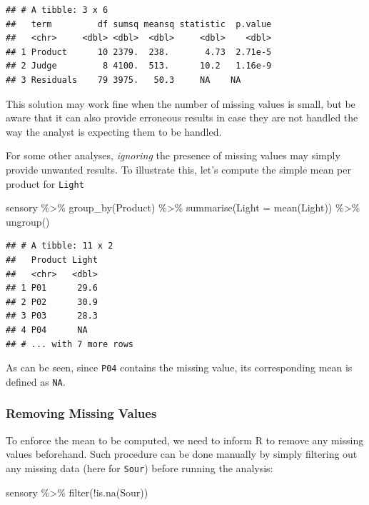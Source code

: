 \documentclass[
]{krantz}
\makeatletter
\newenvironment{Shaded}{\begin{snugshade}}{\end{snugshade}}
\newcommand{\AttributeTok}[1]{\textcolor[rgb]{0.61,0.61,0.61}{#1}}
\newcommand{\FunctionTok}[1]{\textcolor[rgb]{0,0,0}{#1}}
\newcommand{\NormalTok}[1]{#1}
\newcommand{\SpecialCharTok}[1]{\textcolor[rgb]{0,0,0}{#1}}
\newenvironment{kframe}{%
\medskip{}
\setlength{\fboxsep}{.8em}
 \def\at@end@of@kframe{}%
 \ifinner\ifhmode%
  \def\at@end@of@kframe{\end{minipage}}%
  \begin{minipage}{\columnwidth}%
 \fi\fi%
 \def\FrameCommand##1{\hskip\@totalleftmargin \hskip-\fboxsep
 \colorbox{shadecolor}{##1}\hskip-\fboxsep
     \hskip-\linewidth \hskip-\@totalleftmargin \hskip\columnwidth}%
 \MakeFramed {\advance\hsize-\width
   \@totalleftmargin\z@ \linewidth\hsize
   \@setminipage}}%
 {\par\unskip\endMakeFramed%
 \at@end@of@kframe}
\renewenvironment{Shaded}{\begin{kframe}}{\end{kframe}}
\makeatother
\begin{document}
\begin{verbatim}
## # A tibble: 3 x 6
##   term         df sumsq meansq statistic  p.value
##   <chr>     <dbl> <dbl>  <dbl>     <dbl>    <dbl>
## 1 Product      10 2379.  238.       4.73  2.71e-5
## 2 Judge         8 4100.  513.      10.2   1.16e-9
## 3 Residuals    79 3975.   50.3     NA    NA
\end{verbatim}

This solution may work fine when the number of missing values is small, but be aware that it can also provide erroneous results in case they are not handled the way the analyst is expecting them to be handled.

For some other analyses, \emph{ignoring} the presence of missing values may simply provide unwanted results. To illustrate this, let's compute the simple mean per product for \texttt{Light}

\begin{Shaded}
\begin{Highlighting}[]
\NormalTok{sensory }\SpecialCharTok{\%\textgreater{}\%} 
  \FunctionTok{group\_by}\NormalTok{(Product) }\SpecialCharTok{\%\textgreater{}\%} 
  \FunctionTok{summarise}\NormalTok{(}\AttributeTok{Light =} \FunctionTok{mean}\NormalTok{(Light)) }\SpecialCharTok{\%\textgreater{}\%} 
  \FunctionTok{ungroup}\NormalTok{()}
\end{Highlighting}
\end{Shaded}

\begin{verbatim}
## # A tibble: 11 x 2
##   Product Light
##   <chr>   <dbl>
## 1 P01      29.6
## 2 P02      30.9
## 3 P03      28.3
## 4 P04      NA  
## # ... with 7 more rows
\end{verbatim}

As can be seen, since \texttt{P04} contains the missing value, its corresponding mean is defined as \texttt{NA}.

\hypertarget{removing-missing-values}{%
\subsubsection{Removing Missing Values}\label{removing-missing-values}}

To enforce the mean to be computed, we need to inform R to remove any missing values beforehand. Such procedure can be done manually by simply filtering out any missing data (here for \texttt{Sour}) before running the analysis:

\begin{Shaded}
\begin{Highlighting}[]
\NormalTok{sensory }\SpecialCharTok{\%\textgreater{}\%} 
  \FunctionTok{filter}\NormalTok{(}\SpecialCharTok{!}\FunctionTok{is.na}\NormalTok{(Sour))}
\end{Highlighting}
\end{Shaded}
\end{document}
